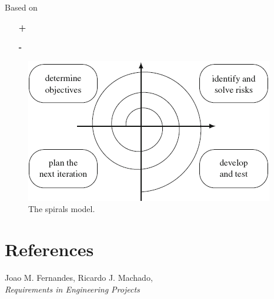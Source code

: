 \subsection*{ \cite{req_en_book}}
Based on
\begin{itemize}
	\item[\textbf{+}] 
	\item[\textbf{-}] 
\end{itemize}
\begin{figure}[h]
	\centering
	\includegraphics[width=0.75\linewidth]{Resources/4_spiral.png}
	\caption{The spirals model.}
	\label{fig:transformational}
\end{figure} 


\chapter{References}

\begin{thebibliography}{9}
	
	Joao M. Fernandes, Ricardo J. Machado, \\
	\emph{Requirements in Engineering Projects}
	
\end{thebibliography}


\appendix



